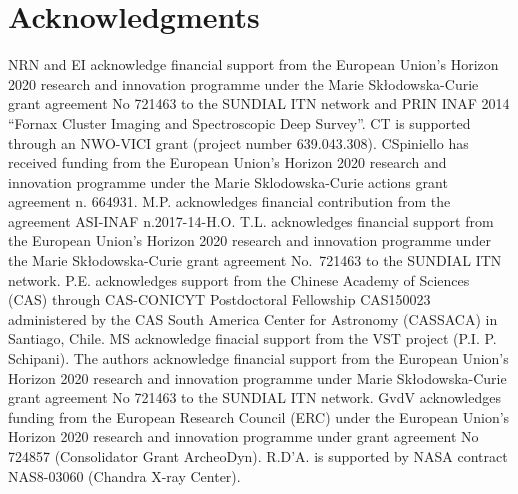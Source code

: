 \documentclass[useAMS,usenatbib]{mn2e}
\begin{document}
\section*{Acknowledgments}

NRN and EI acknowledge financial support from the European Union’s Horizon
2020 research and innovation programme under the Marie Sk\l{}odowska-Curie
grant agreement No 721463 to the SUNDIAL ITN network and  PRIN INAF 2014 
``Fornax Cluster Imaging and Spectroscopic Deep Survey''.
CT is supported through an NWO-VICI grant (project number 639.043.308).
CSpiniello has received funding from the European Union's Horizon 2020 
research and innovation programme under the Marie Sklodowska-Curie 
actions grant agreement n. 664931.
M.P. acknowledges financial contribution from the agreement ASI-INAF n.2017-14-H.O.
T.L. acknowledges financial support from the European Union's Horizon 2020 
research and innovation programme under the Marie Sk\l{}odowska-Curie 
grant agreement No.\ 721463 to the SUNDIAL ITN network.
P.E. acknowledges support from the Chinese Academy of Sciences (CAS) 
through CAS-CONICYT Postdoctoral  Fellowship CAS150023 administered 
by the CAS South America Center for Astronomy (CASSACA) in Santiago,  Chile.
MS acknowledge finacial support from the VST project (P.I. P. Schipani).
The authors acknowledge financial support from the European Union’s 
Horizon 2020 research and innovation programme under Marie Sk\l{}odowska-Curie 
grant agreement No 721463 to the SUNDIAL ITN network.
GvdV acknowledges funding from the European Research Council (ERC) under 
the European Union's Horizon 2020 research and innovation programme 
under grant agreement No 724857 (Consolidator Grant ArcheoDyn).
R.D'A. is supported by NASA contract NAS8-03060 (Chandra X-ray Center).



\end{document}
